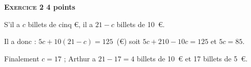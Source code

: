 \textbf{\textsc{Exercice 2} \hfill 4 points}

\medskip 

% 
%
% 
S'il a $c$ billets de cinq \euro, il a $21 - c$ billets de 10~\euro.

Il a donc :
$5c + 10(21 - c) = 125$~(\euro) soit $5c + 210 - 10c = 125$ et $5c = 85$.

Finalement $c = 17$ ; Arthur a $21 - 17 = 4$ billets de 10~\euro{} et 17 billets de 5~\euro.

%

\bigskip


